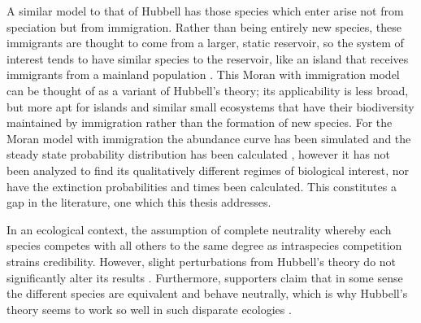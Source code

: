 A similar model to that of Hubbell has those species which enter arise not from speciation but from immigration\cite{McKane2003,Kessler2015}. 
Rather than being entirely new species, these immigrants are thought to come from a larger, static reservoir, so the system of interest tends to have similar species to the reservoir, like an island that receives immigrants from a mainland population \cite{MacArthur1967a}. 
This Moran with immigration model can be thought of as a variant of Hubbell's theory; its applicability is less broad, but more apt for islands and similar small ecosystems that have their biodiversity maintained by immigration rather than the formation of new species. 
For the Moran model with immigration the abundance curve has been simulated \cite{Kessler2015} and the steady state probability distribution has been calculated \cite{McKane2003}, however it has not been analyzed to find its qualitatively different regimes of biological interest, nor have the extinction probabilities and times been calculated. 
This constitutes a gap in the literature, one which this thesis addresses. 

In an ecological context, the assumption of complete neutrality whereby each species competes with all others to the same degree as intraspecies competition strains credibility. 
However, slight perturbations from Hubbell's theory do not significantly alter its results \cite{Rosindell2011}. 
Furthermore, supporters claim that in some sense the different species are equivalent and behave neutrally, which is why Hubbell's theory seems to work so well in such disparate ecologies \cite{Leibold2006,Leigh2007,Hubbell2006,Rosindell2011}. 



